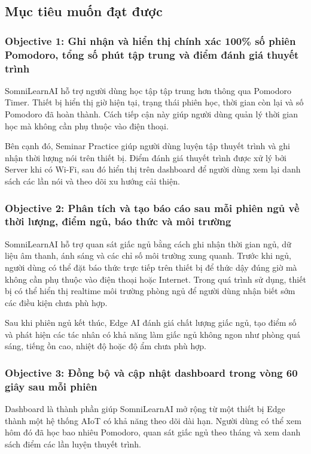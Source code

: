 \documentclass[12pt,a4paper]{article}
\begin{document}
\subsection{Mục tiêu muốn đạt được}

\subsubsection{Objective 1: Ghi nhận và hiển thị chính xác 100\% số phiên Pomodoro, tổng số phút tập trung và điểm đánh giá thuyết trình}

SomniLearnAI hỗ trợ người dùng học tập tập trung hơn thông qua Pomodoro Timer. Thiết bị hiển thị giờ hiện tại, trạng thái phiên học, thời gian còn lại và số Pomodoro đã hoàn thành. Cách tiếp cận này giúp người dùng quản lý thời gian học mà không cần phụ thuộc vào điện thoại.

Bên cạnh đó, Seminar Practice giúp người dùng luyện tập thuyết trình và ghi nhận thời lượng nói trên thiết bị. Điểm đánh giá thuyết trình được xử lý bởi Server khi có Wi-Fi, sau đó hiển thị trên dashboard để người dùng xem lại danh sách các lần nói và theo dõi xu hướng cải thiện.

\subsubsection{Objective 2: Phân tích và tạo báo cáo sau mỗi phiên ngủ về thời lượng, điểm ngủ, báo thức và môi trường}

SomniLearnAI hỗ trợ quan sát giấc ngủ bằng cách ghi nhận thời gian ngủ, dữ liệu âm thanh, ánh sáng và các chỉ số môi trường xung quanh. Trước khi ngủ, người dùng có thể đặt báo thức trực tiếp trên thiết bị để thức dậy đúng giờ mà không cần phụ thuộc vào điện thoại hoặc Internet. Trong quá trình sử dụng, thiết bị có thể hiển thị realtime môi trường phòng ngủ để người dùng nhận biết sớm các điều kiện chưa phù hợp.

Sau khi phiên ngủ kết thúc, Edge AI đánh giá chất lượng giấc ngủ, tạo điểm số và phát hiện các tác nhân có khả năng làm giấc ngủ không ngon như phòng quá sáng, tiếng ồn cao, nhiệt độ hoặc độ ẩm chưa phù hợp.

\subsubsection{Objective 3: Đồng bộ và cập nhật dashboard trong vòng 60 giây sau mỗi phiên}

Dashboard là thành phần giúp SomniLearnAI mở rộng từ một thiết bị Edge thành một hệ thống AIoT có khả năng theo dõi dài hạn. Người dùng có thể xem hôm đó đã học bao nhiêu Pomodoro, quan sát giấc ngủ theo tháng và xem danh sách điểm các lần luyện thuyết trình.
\end{document}
